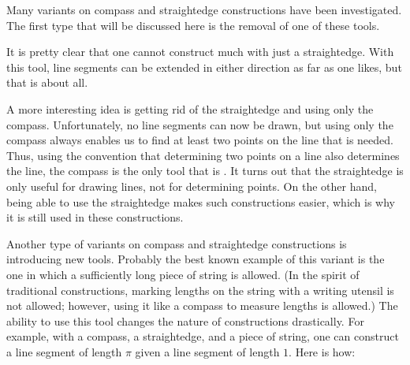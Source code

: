 \documentclass[12pt]{article}
\begin{document}

Many variants on compass and straightedge constructions have been investigated.  The first type that will be discussed here is the removal of one of these tools.

It is pretty clear that one cannot construct much with just a straightedge.  With this tool, line segments can be extended in either direction as far as one likes, but that is about all.

A more interesting idea is getting rid of the straightedge and using only the compass.  Unfortunately, no line segments can now be drawn, but using only the compass always enables us to find at least two points on the line that is needed.  Thus, using the convention that determining two points on a line also determines the line, the compass is the only tool that is .  It turns out that the straightedge is only useful for drawing lines, not for determining points.  On the other hand, being able to use the straightedge makes such constructions easier, which is why it is still used in these constructions.

Another type of variants on compass and straightedge constructions is introducing new tools.  Probably the best known example of this variant is the one in which a sufficiently long piece of string is allowed.  (In the spirit of traditional constructions, marking lengths on the string with a writing utensil is not allowed; however, using it like a compass to measure lengths is allowed.)  The ability to use this tool changes the nature of constructions drastically.  For example, with a compass, a straightedge, and a piece of string, one can construct a line segment of length $\pi$ given a line segment of length $1$.  Here is how:
\end{document}
